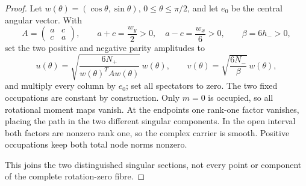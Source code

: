 \documentclass[11pt]{article}
\theoremstyle{definition}
\theoremstyle{remark}
\begin{document}
\begin{proof}
Let \(w(\theta)=(\cos\theta,\sin\theta)\),
\(0\leq\theta\leq\pi/2\), and let \(e_0\) be the central angular vector.
With
\[
 A=\begin{pmatrix}a&c\\c&a\end{pmatrix},
 \qquad a+c=\frac{w_y}{2}>0,\quad a-c=\frac{w_x}{6}>0,
 \qquad \beta=6h_->0,
\]
set the two positive and negative parity amplitudes to
\[
 u(\theta)=
 \sqrt{\frac{6N_+}{w(\theta)^TAw(\theta)}}\,w(\theta),
 \qquad
 v(\theta)=\sqrt{\frac{6N_-}{\beta}}\,w(\theta),
\]
and multiply every column by \(e_0\); set all spectators to zero.
The two fixed occupations are constant by construction.  Only \(m=0\) is
occupied, so all rotational moment maps vanish.  At the endpoints one
rank-one factor vanishes, placing the path in the two different singular
components.  In the open interval both factors are nonzero rank one, so the
complex carrier is smooth.  Positive occupations keep both total node norms
nonzero.

This joins the two distinguished singular sections, not every point or
component of the complete rotation-zero fibre.
\end{proof}
\end{document}
